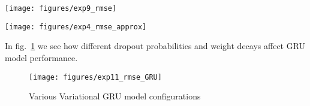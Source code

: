 \documentclass{article}
\theoremstyle{definition}
\begin{document}
\begin{figure*}[h]
\center
\begin{minipage}{0.3\linewidth}
\texttt{[image: figures/exp9\_rmse]}

\vspace{-2mm}
\caption{Test error for various embedding dropout probabilities, with sequence length 50.}
\label{fig:BRNN-seq-length-50}
\end{minipage}
\hspace{2mm}
\begin{minipage}{0.3\linewidth}
\texttt{[image: figures/exp4\_rmse\_approx]}

\vspace{-2mm}
\caption{Dropout approximation in Variational LSTM with different dropout probabilities.}
\label{fig:BRNN-approx}
\end{minipage}
\end{figure*}




















In fig.\ \ref{fig:BGRU-b} we see how different dropout probabilities and weight decays affect GRU model performance.


\begin{figure*}[h]
\vspace{-2mm}
\center
\begin{subfigure}{0.49\linewidth}
\texttt{[image: figures/exp11\_rmse\_GRU]}

\caption{Various Variational GRU model configurations}
\label{fig:BGRU-b}
\end{subfigure}

\vspace{3mm}
\caption{\textbf{Sentiment analysis error for \textit{Variational GRU} compared to \textit{naive dropout GRU} and \textit{standard GRU} (with no dropout).} Test error for the different models (left) and for different Variational GRU configurations (right).}
\label{fig:BGRU}
\end{figure*}
\end{document}
